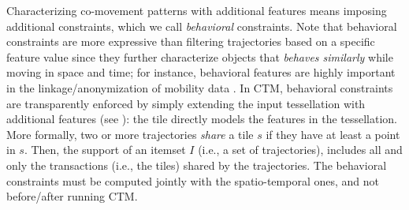 \documentclass[
]{ceurart}
\begin{document}
%
Characterizing co-movement patterns with additional features means imposing additional constraints, which we call \textit{behavioral} constraints. 
Note that behavioral constraints are more expressive than filtering trajectories based on a specific feature value since they further characterize objects that \textit{behaves similarly} while moving in space and time; for instance, behavioral features are highly important in the linkage/anonymization of mobility data \citep{DBLP:journals/tkde/JinHFCOZ23}.
In CTM, behavioral constraints are transparently enforced by simply extending the input tessellation with additional features (see ): the tile directly models the features in the tessellation.
More formally, two or more trajectories \textit{share} a tile $s$ if they have at least a point in $s$. Then, the support of an itemset $I$ (i.e., a set of trajectories), includes all and only the transactions (i.e., the tiles) shared by the trajectories.
The behavioral constraints must be computed jointly with the spatio-temporal ones, and not before/after running CTM.
\end{document}
